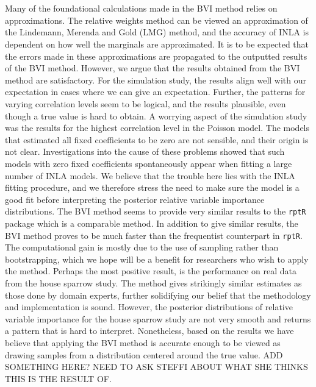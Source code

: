 \\
\\
Many of the foundational calculations made in the BVI method relies on approximations. The relative weights method can be viewed an approximation of the Lindemann, Merenda and Gold (LMG) method, and the accuracy of INLA is dependent on how well the marginals are approximated. It is to be expected that the errors made in these approximations are propagated to the outputted results of the BVI method. However, we argue that the results obtained from the BVI method are satisfactory. For the simulation study, the results align well with our expectation in cases where we can give an expectation. Further, the patterns for varying correlation levels seem to be logical, and the results plausible, even though a true value is hard to obtain. A worrying aspect of the simulation study was the results for the highest correlation level in the Poisson model. The models that estimated all fixed coefficients to be zero are not sensible, and their origin is not clear. Investigations into the cause of these problems showed that such models with zero fixed coefficients spontaneously appear when fitting a large number of INLA models. We believe that the trouble here lies with the INLA fitting procedure, and we therefore stress the need to make sure the model is a good fit before interpreting the posterior relative variable importance distributions. The BVI method seems to provide very similar results to the \texttt{rptR} package which is a comparable method. In addition to give similar results, the BVI method proves to be much faster than the frequentist counterpart in \texttt{rptR}. The computational gain is mostly due to the use of sampling rather than bootstrapping, which we hope will be a benefit for researchers who wish to apply the method. Perhaps the most positive result, is the performance on real data from the house sparrow study. The method gives strikingly similar estimates as those done by domain experts, further solidifying our belief that the methodology and implementation is sound. However, the posterior distributions of relative variable importance for the house sparrow study are not very smooth and returns a pattern that is hard to interpret. Nonetheless, based on the results we have believe that applying the BVI method is accurate enough to be viewed as drawing samples from a distribution centered around the true value.
ADD SOMETHING HERE? NEED TO ASK STEFFI ABOUT WHAT SHE THINKS THIS IS THE RESULT OF.
\\
\\
